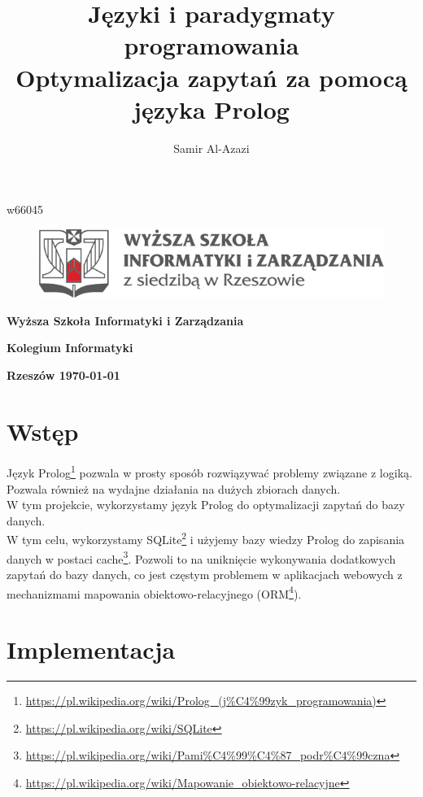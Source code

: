 \documentclass[12pt,a4paper]{article}
\title{Języki i paradygmaty programowania\\Optymalizacja zapytań za pomocą języka Prolog}
\author{Samir Al-Azazi}
\date{\vspace{-5ex}} %
\newcommand{\studentid}{w66045}
\begin{document}
\maketitle
\centerline{\studentid}
\begin{figure}[!h]
    \centering
    \includegraphics{./images/wsiz-logo}
\end{figure}
\centerline{\textbf{Wyższa Szkoła Informatyki i Zarządzania}}
\centerline{\textbf{Kolegium Informatyki}}
\vspace*{\fill}
\centerline{\textbf{Rzeszów \today}} %
\thispagestyle{empty} %
\clearpage

\tableofcontents
{} %
\clearpage

\section{Wstęp}

Język Prolog\footnote{\href{https://pl.wikipedia.org/wiki/Prolog\_(j\%C4\%99zyk\_programowania)}{https://pl.wikipedia.org/wiki/Prolog\_(j\%C4\%99zyk\_programowania)}} pozwala w prosty sposób rozwiązywać problemy związane z logiką. Pozwala również na wydajne działania na dużych zbiorach danych.\\
W tym projekcie, wykorzystamy język Prolog do optymalizacji zapytań do bazy danych.\\
W tym celu, wykorzystamy SQLite\footnote{\href{https://pl.wikipedia.org/wiki/SQLite}{https://pl.wikipedia.org/wiki/SQLite}} i użyjemy bazy wiedzy Prolog do zapisania danych w postaci cache\footnote{\href{https://pl.wikipedia.org/wiki/Pami\%C4\%99\%C4\%87\_podr\%C4\%99czna}{https://pl.wikipedia.org/wiki/Pami\%C4\%99\%C4\%87\_podr\%C4\%99czna}}. Pozwoli to na uniknięcie wykonywania dodatkowych zapytań do bazy danych, co jest częstym problemem w aplikacjach webowych z mechanizmami mapowania obiektowo-relacyjnego (ORM\footnote{\href{https://pl.wikipedia.org/wiki/Mapowanie\_obiektowo-relacyjne}{https://pl.wikipedia.org/wiki/Mapowanie\_obiektowo-relacyjne}}). 

\section{Implementacja}
\end{document}
